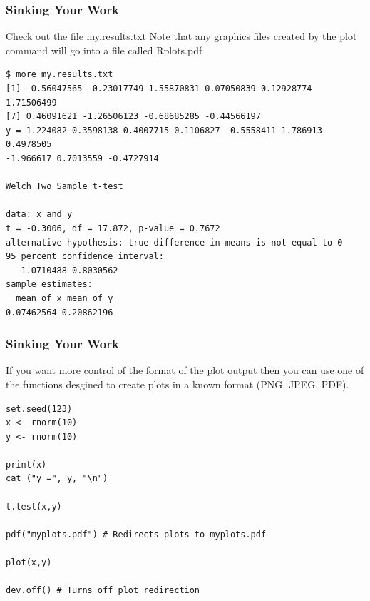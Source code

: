 \documentclass{beamer}
\begin{document}
\begin{frame}[fragile]
\frametitle{Sinking Your Work}
Check out the file my.results.txt Note that any graphics files created by the plot command will go into a file called Rplots.pdf
\footnotesize
\begin{verbatim}
$ more my.results.txt
[1] -0.56047565 -0.23017749 1.55870831 0.07050839 0.12928774 1.71506499
[7] 0.46091621 -1.26506123 -0.68685285 -0.44566197
y = 1.224082 0.3598138 0.4007715 0.1106827 -0.5558411 1.786913 0.4978505
-1.966617 0.7013559 -0.4727914

Welch Two Sample t-test

data: x and y
t = -0.3006, df = 17.872, p-value = 0.7672
alternative hypothesis: true difference in means is not equal to 0
95 percent confidence interval:
  -1.0710488 0.8030562
sample estimates:
  mean of x mean of y
0.07462564 0.20862196
\end{verbatim}
\end{frame}


\begin{frame}[fragile]
\frametitle{Sinking Your Work}
If you want more control of the format of the plot output then you can use one of the functions desgined to create plots in a known format (PNG, JPEG, PDF).
\footnotesize
\begin{verbatim}
set.seed(123)
x <- rnorm(10)
y <- rnorm(10)

print(x)
cat ("y =", y, "\n")

t.test(x,y)

pdf("myplots.pdf") # Redirects plots to myplots.pdf

plot(x,y)

dev.off() # Turns off plot redirection
\end{verbatim}
\end{frame}


\end{document}

